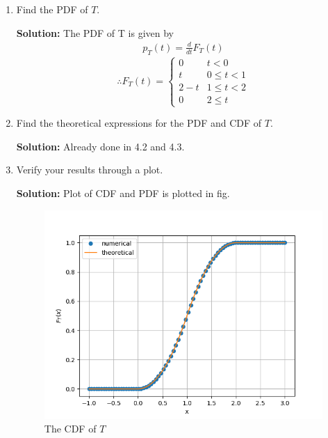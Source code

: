 \documentclass[journal,12pt,twocolumn]{IEEEtran}
\renewcommand\thesection{\arabic{section}}
\theoremstyle{remark}
\newcommand{\solution}{\noindent \textbf{Solution: }}
\numberwithin{equation}{section}
\begin{document}
\begin{enumerate}[label=\thesection.\arabic*
,ref=\thesection.\theenumi]
\[
\therefore
F_T(t)=
\begin{cases}
	0&  t<0\\
	\frac{t_2}{2} &  0\leq t<1\\
	\frac{-t^2}{2}+2t-1  &  1\leq t<2\\
	1  & 2\leq t
\end{cases}
\]
\item Find the PDF of $T$.

\solution The PDF of T is given by
\begin{align}
	p_{T}(t) = \frac{d}{dt}F_{T}(t)
\end{align}
\[
\therefore
F_T(t)=
\begin{cases}
	0&  t<0\\
	t &  0\leq t<1\\
	2-t  &  1\leq t<2\\
	0  & 2\leq t
\end{cases}
\]
\item Find the theoretical expressions for the PDF and CDF of $T$.

\solution Already done in 4.2 and 4.3.
\item Verify your results through a plot. 

\solution Plot of CDF and PDF is plotted in fig. 

\begin{figure}
	\centering
		\includegraphics[width=\columnwidth]{./ques_4/tri_cdf.png}
	\caption{The CDF of $T$}
	\label{tri_cdf}
\end{figure}


\end{enumerate}
\end{document}
